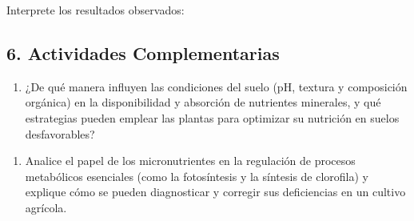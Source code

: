 \documentclass[
  spanish,
  10pt,
  letterpaper,
  twocolumn]{article}
\providecommand{\tightlist}{%
  \setlength{\itemsep}{0pt}\setlength{\parskip}{0pt}}
\begin{document}
\begin{center}
\end{center}

Interprete los resultados observados:

\hrulefill

\hrulefill

\hrulefill

\hrulefill

\hrulefill

\subsection{6. Actividades
Complementarias}\label{actividades-complementarias}

\begin{enumerate}
\def\labelenumi{\arabic{enumi}.}
\tightlist
\item
  ¿De qué manera influyen las condiciones del suelo (pH, textura y
  composición orgánica) en la disponibilidad y absorción de nutrientes
  minerales, y qué estrategias pueden emplear las plantas para optimizar
  su nutrición en suelos desfavorables?
\end{enumerate}

\hrulefill

\hrulefill

\hrulefill

\hrulefill

\begin{enumerate}
\def\labelenumi{\arabic{enumi}.}
\setcounter{enumi}{1}
\tightlist
\item
  Analice el papel de los micronutrientes en la regulación de procesos
  metabólicos esenciales (como la fotosíntesis y la síntesis de
  clorofila) y explique cómo se pueden diagnosticar y corregir sus
  deficiencias en un cultivo agrícola.
\end{enumerate}
\end{document}
